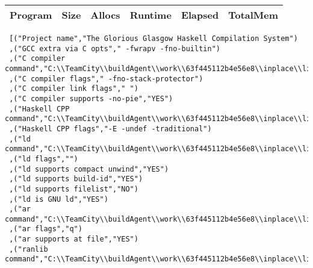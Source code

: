 \begin{tabular}{ c c c c c c }
Program & Size & Allocs & Runtime & Elapsed & TotalMem\\
\hline
\end{tabular}
\begin{verbatim}
 [("Project name","The Glorious Glasgow Haskell Compilation System")
 ,("GCC extra via C opts"," -fwrapv -fno-builtin")
 ,("C compiler command","C:\\TeamCity\\buildAgent\\work\\63f445112b4e56e8\\inplace\\lib\\../mingw/bin/gcc.exe")
 ,("C compiler flags"," -fno-stack-protector")
 ,("C compiler link flags"," ")
 ,("C compiler supports -no-pie","YES")
 ,("Haskell CPP command","C:\\TeamCity\\buildAgent\\work\\63f445112b4e56e8\\inplace\\lib\\../mingw/bin/gcc.exe")
 ,("Haskell CPP flags","-E -undef -traditional")
 ,("ld command","C:\\TeamCity\\buildAgent\\work\\63f445112b4e56e8\\inplace\\lib\\../mingw/bin/ld.exe")
 ,("ld flags","")
 ,("ld supports compact unwind","YES")
 ,("ld supports build-id","YES")
 ,("ld supports filelist","NO")
 ,("ld is GNU ld","YES")
 ,("ar command","C:\\TeamCity\\buildAgent\\work\\63f445112b4e56e8\\inplace\\lib\\../mingw/bin/ar.exe")
 ,("ar flags","q")
 ,("ar supports at file","YES")
 ,("ranlib command","C:\\TeamCity\\buildAgent\\work\\63f445112b4e56e8\\inplace\\lib\\../mingw/bin/ranlib.exe")

\end{verbatim}
